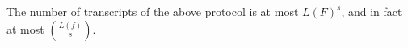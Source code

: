 \documentclass{article}
\newcommand{\prot}{\mathrm{PROT}}
\begin{document}
    


            
        
        

\begin{claim}
    \label{claim:no. of transcripts}
    The number of transcripts of the above protocol is at most $L(F)^s$, and in fact at most $\binom{L(f)}{s}$.
\end{claim}

\newcommand{\kwleft}{\text{KWleft}}
          
\end{document}
